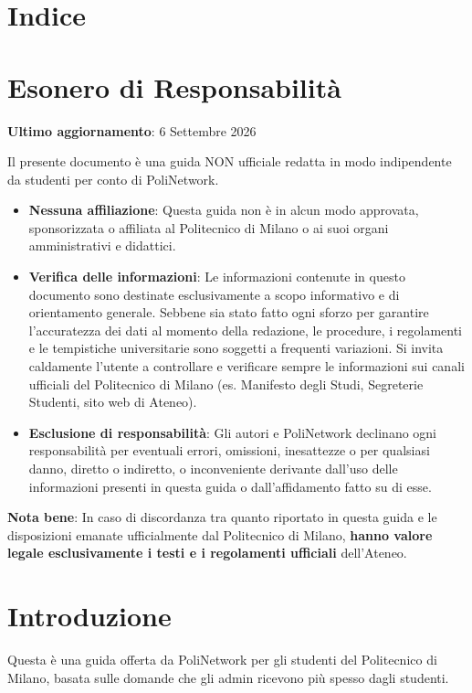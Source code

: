 \documentclass[legal]{polinetwork}
\makeatletter
\renewcommand{\contentsname}{Indice}
\renewcommand{\tableofcontents}{%
  \section*{\contentsname}%
  \vspace{0.25em}%
  \@starttoc{toc}%
}
\makeatother
\begin{document}
\pnMakeHeader

\tableofcontents
\newpage



\section{Esonero di Responsabilità}


\textbf{Ultimo aggiornamento}: 6 Settembre 2026

Il presente documento è una guida NON ufficiale redatta in modo indipendente da studenti per conto di PoliNetwork.

\begin{itemize}
  \item \textbf{Nessuna affiliazione}: Questa guida non è in alcun modo approvata, sponsorizzata o affiliata al Politecnico di Milano o ai suoi organi amministrativi e didattici.
  \item \textbf{Verifica delle informazioni}: Le informazioni contenute in questo documento sono destinate esclusivamente a scopo informativo e di orientamento generale. Sebbene sia stato fatto ogni sforzo per garantire l'accuratezza dei dati al momento della redazione, le procedure, i regolamenti e le tempistiche universitarie sono soggetti a frequenti variazioni. Si invita caldamente l'utente a controllare e verificare sempre le informazioni sui canali ufficiali del Politecnico di Milano (es. Manifesto degli Studi, Segreterie Studenti, sito web di Ateneo).
  \item \textbf{Esclusione di responsabilità}: Gli autori e PoliNetwork declinano ogni responsabilità per eventuali errori, omissioni, inesattezze o per qualsiasi danno, diretto o indiretto, o inconveniente derivante dall'uso delle informazioni presenti in questa guida o dall'affidamento fatto su di esse.
\end{itemize}



\textbf{Nota bene}: In caso di discordanza tra quanto riportato in questa guida e le disposizioni emanate ufficialmente dal Politecnico di Milano, \textbf{hanno valore legale esclusivamente i testi e i regolamenti ufficiali} dell'Ateneo.


\section{Introduzione}


Questa è una guida offerta da PoliNetwork per gli studenti del Politecnico di Milano, basata sulle domande che gli admin ricevono più spesso dagli studenti.
\end{document}
